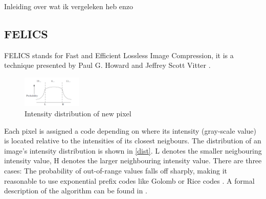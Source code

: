 Inleiding over wat ik vergeleken heb enzo
\subsection{FELICS}
FELICS stands for Fast and Efficient Lossless Image Compression, it is a technique presented by Paul G. Howard and Jeffrey Scott Vitter \cite{felics}.
\begin{figure}[h]
    \centering
    \includegraphics[width=0.25\textwidth]{figs/probability_intensity_P.png}
    \caption{Intensity distribution of new pixel \cite{felics}}
    \label{fig:dist}
\end{figure}
Each pixel is assigned a code depending on where its intensity (gray-scale value) is located relative to the intensities of its closest neigbours. The distribution of an image's intensity distribution is shown in \ref{dist}. L denotes the smaller neigbouring intensity value, H denotes the larger neighbouring intensity value. There are three cases:
The probability of out-of-range values falls off sharply, making it reasonable to use exponential prefix codes like Golomb or Rice codes \cite{felics}.
A formal description of the algorithm can be found in \cite{felics}.